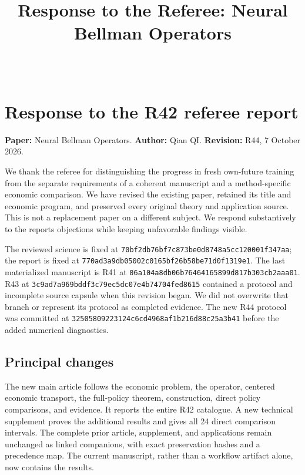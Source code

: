 \documentclass[ecta,nameyear,draft]{econsocart}
\begin{document}
\begin{frontmatter}\title{Response to the Referee: Neural Bellman Operators}
\begin{aug}\author[id=au1,addressref={add1}]{~}\address[id=add1]{Peking University}\end{aug}
\end{frontmatter}
\hypertarget{response-to-the-r42-referee-report}{%
\section{Response to the R42 referee
report}\label{response-to-the-r42-referee-report}}

\textbf{Paper:} Neural Bellman Operators. \textbf{Author:} Qian QI.
\textbf{Revision:} R44, 7 October 2026.

We thank the referee for distinguishing the progress in fresh own-future
training from the separate requirements of a coherent manuscript and a
method-specific economic comparison. We have revised the existing paper,
retained its title and economic program, and preserved every original
theory and application source. This is not a replacement paper on a
different subject. We respond substantively to the
report\textquotesingle s objections while keeping unfavorable findings
visible.

The reviewed science is fixed at
\nolinkurl{70bf2db76bf7c873be0d8748a5cc120001f347aa}; the report is fixed
at \nolinkurl{770ad3a9db05002c0165bf26b58be71d0f1319e1}. The last
materialized manuscript is R41 at
\nolinkurl{06a104a8db06b76464165899d817b303cb2aaa01}. R43 at
\nolinkurl{3c9ad7a969bddf3c79ec5dc07e4b74704fed8615} contained a protocol
and incomplete source capsule when this revision began. We did not
overwrite that branch or represent its protocol as completed evidence.
The new R44 protocol was committed at
\nolinkurl{32505809223124c6cd4968af1b216d88c25a3b41} before the added
numerical diagnostics.

\hypertarget{principal-changes}{%
\subsection{Principal changes}\label{principal-changes}}

The new main article follows the economic problem, the operator,
centered economic transport, the full-policy theorem, construction,
direct policy comparisons, and evidence. It reports the entire R42
catalogue. A new technical supplement proves the additional results and
gives all 24 direct comparison intervals. The complete prior article,
supplement, and applications remain unchanged as linked companions, with
exact preservation hashes and a precedence map. The current manuscript,
rather than a workflow artifact alone, now contains the results.
\end{document}
